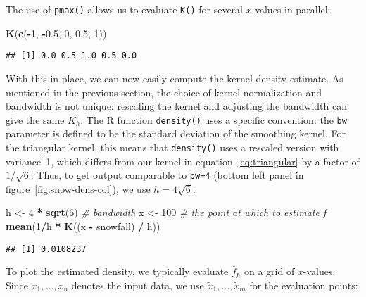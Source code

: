 \documentclass[
  a4paper,
]{article}
\newenvironment{Shaded}{\begin{snugshade}}{\end{snugshade}}
\newcommand{\CommentTok}[1]{\textcolor[rgb]{0.56,0.35,0.01}{\textit{#1}}}
\newcommand{\DecValTok}[1]{\textcolor[rgb]{0.00,0.00,0.81}{#1}}
\newcommand{\FloatTok}[1]{\textcolor[rgb]{0.00,0.00,0.81}{#1}}
\newcommand{\FunctionTok}[1]{\textcolor[rgb]{0.13,0.29,0.53}{\textbf{#1}}}
\newcommand{\NormalTok}[1]{#1}
\newcommand{\OtherTok}[1]{\textcolor[rgb]{0.56,0.35,0.01}{#1}}
\newcommand{\SpecialCharTok}[1]{\textcolor[rgb]{0.81,0.36,0.00}{\textbf{#1}}}
\theoremstyle{definition}
\theoremstyle{definition}
\theoremstyle{definition}
\theoremstyle{definition}
\theoremstyle{remark}
\begin{document}
The use of \texttt{pmax()} allows us to evaluate \texttt{K()} for several \(x\)-values in parallel:

\begin{Shaded}
\begin{Highlighting}[]
\FunctionTok{K}\NormalTok{(}\FunctionTok{c}\NormalTok{(}\SpecialCharTok{{-}}\DecValTok{1}\NormalTok{, }\SpecialCharTok{{-}}\FloatTok{0.5}\NormalTok{, }\DecValTok{0}\NormalTok{, }\FloatTok{0.5}\NormalTok{, }\DecValTok{1}\NormalTok{))}
\end{Highlighting}
\end{Shaded}

\begin{verbatim}
## [1] 0.0 0.5 1.0 0.5 0.0
\end{verbatim}

With this in place, we can now easily compute the kernel density estimate.
As mentioned in the previous section, the choice of kernel normalization and
bandwidth is not unique: rescaling the kernel and adjusting the bandwidth can
give the same \(K_h\). The R function \texttt{density()} uses a specific convention:
the \texttt{bw} parameter is defined to be the standard deviation of the smoothing kernel.
For the triangular kernel, this means that \texttt{density()} uses a rescaled version
with variance~1, which differs from our kernel in equation~\eqref{eq:triangular}
by a factor of \(1/\sqrt{6}\). Thus, to get output comparable to \texttt{bw=4}
(bottom left panel in figure~\ref{fig:snow-dens-col}), we use \(h = 4\sqrt{6}\):

\begin{Shaded}
\begin{Highlighting}[]
\NormalTok{h }\OtherTok{\textless{}{-}} \DecValTok{4} \SpecialCharTok{*} \FunctionTok{sqrt}\NormalTok{(}\DecValTok{6}\NormalTok{) }\CommentTok{\# bandwidth}
\NormalTok{x }\OtherTok{\textless{}{-}} \DecValTok{100} \CommentTok{\# the point at which to estimate f}
\FunctionTok{mean}\NormalTok{(}\DecValTok{1}\SpecialCharTok{/}\NormalTok{h }\SpecialCharTok{*} \FunctionTok{K}\NormalTok{((x }\SpecialCharTok{{-}}\NormalTok{ snowfall) }\SpecialCharTok{/}\NormalTok{ h))}
\end{Highlighting}
\end{Shaded}

\begin{verbatim}
## [1] 0.0108237
\end{verbatim}

To plot the estimated density, we typically evaluate \(\hat f_h\) on a grid of \(x\)-values.
Since \(x_1, \ldots, x_n\) denotes the input data, we use \(\tilde x_1, \ldots, \tilde x_m\)
for the evaluation points:
\end{document}
